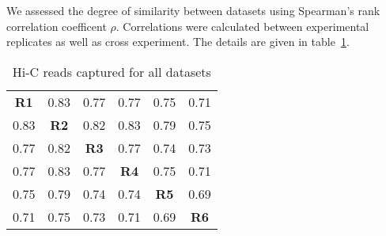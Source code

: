We assessed the degree of similarity between datasets using Spearman's rank correlation coefficent $\rho$.  Correlations were calculated between experimental
replicates as well as cross experiment.  The details are given in table~\ref{tab:correlations}.

\begin{table}[ht]
  \centering
  \caption{Hi-C reads captured for all datasets}
  \label{tab:correlations}
  \begin{tabular}{cccccc}
    \toprule
    \textbf{R1} & 0.83 & 0.77 & 0.77 & 0.75 & 0.71 \\
    0.83 & \textbf{R2} & 0.82 & 0.83 & 0.79 & 0.75 \\
    0.77 & 0.82 & \textbf{R3} & 0.77 & 0.74 & 0.73 \\
    0.77 & 0.83 & 0.77 & \textbf{R4} & 0.75 & 0.71 \\
    0.75 & 0.79 & 0.74 & 0.74 & \textbf{R5} & 0.69 \\
    0.71 & 0.75 & 0.73 & 0.71 & 0.69 & \textbf{R6} \\
    \bottomrule
  \end{tabular}
\end{table}
